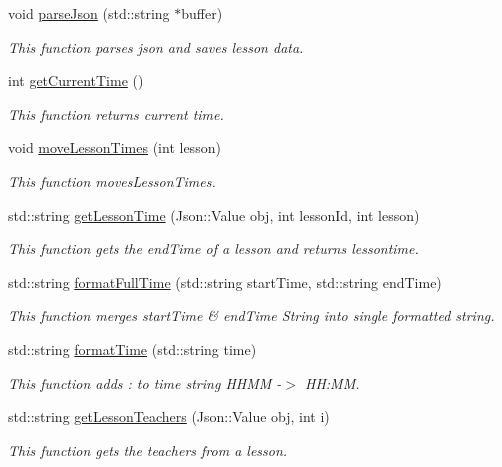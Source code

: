 \begin{DoxyCompactItemize}
void \hyperlink{classCurlHandler_a2e63afaaf3fd64263505f90821f02d05}{parse\+Json} (std\+::string $\ast$buffer)
\begin{DoxyCompactList}\small\item\em This function parses json and saves lesson data. \end{DoxyCompactList}\item 
int \hyperlink{classCurlHandler_a54e7bc698682a0b313b3de0f6d2c7cf4}{get\+Current\+Time} ()
\begin{DoxyCompactList}\small\item\em This function returns current time. \end{DoxyCompactList}\item 
void \hyperlink{classCurlHandler_af6808f78b075e81747be9ff5c19a8b61}{move\+Lesson\+Times} (int lesson)
\begin{DoxyCompactList}\small\item\em This function moves\+Lesson\+Times. \end{DoxyCompactList}\item 
std\+::string \hyperlink{classCurlHandler_aa62b036298bc0ca7365cb32919996a54}{get\+Lesson\+Time} (Json\+::\+Value obj, int lesson\+Id, int lesson)
\begin{DoxyCompactList}\small\item\em This function gets the end\+Time of a lesson and returns lessontime. \end{DoxyCompactList}\item 
std\+::string \hyperlink{classCurlHandler_ae208efd8422979786ee921c5148b17c7}{format\+Full\+Time} (std\+::string start\+Time, std\+::string end\+Time)
\begin{DoxyCompactList}\small\item\em This function merges start\+Time \& end\+Time String into single formatted string. \end{DoxyCompactList}\item 
std\+::string \hyperlink{classCurlHandler_a8552fd1c4558661d3699e4cbd8897acc}{format\+Time} (std\+::string time)
\begin{DoxyCompactList}\small\item\em This function adds \+: to time string H\+H\+MM -\/$>$ HH\+:MM. \end{DoxyCompactList}\item 
std\+::string \hyperlink{classCurlHandler_acd45a047ecf8bad0977f8e890914a59a}{get\+Lesson\+Teachers} (Json\+::\+Value obj, int i)
\begin{DoxyCompactList}\small\item\em This function gets the teachers from a lesson. \end{DoxyCompactList}\item 

\end{DoxyCompactItemize}
